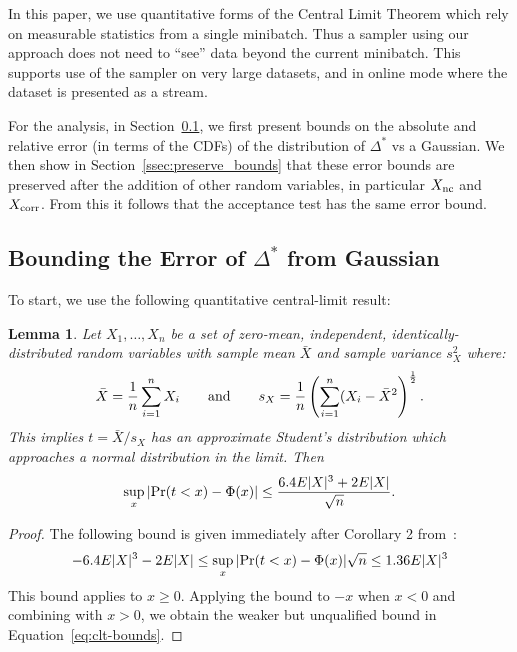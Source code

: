 \documentclass{article}
\newtheorem{lemma}{Lemma}
\begin{document}
In this paper, we use quantitative forms of the Central Limit Theorem which rely
on measurable statistics from a single minibatch. Thus a sampler using our
approach does not need to ``see'' data beyond the current minibatch. This
supports use of the sampler on very large datasets, and in online mode where the
dataset is presented as a stream.

For the analysis, in Section~\ref{ssec:delta_star_distribution}, we first
present bounds on the absolute and relative error (in terms of the CDFs) of the
distribution of $\Delta^*$ vs a Gaussian. We then show in
Section~\ref{ssec:preserve_bounds} that these error bounds are preserved after
the addition of other random variables, in particular $X_{\rm nc}$ and $X_{\rm
corr}$. From this it follows that the acceptance test has the same error bound.

\subsection{Bounding the Error of $\Delta^*$ from Gaussian}\label{ssec:delta_star_distribution}

To start, we use the following quantitative central-limit result:
  
\begin{lemma}\label{lem:quant_clt}
Let $X_1,\ldots,X_n$ be a set of zero-mean, independent, identically-distributed
random variables with sample mean $\bar{X}$ and sample variance $s^2_X$
where:
\begin{equation}
    \bar{X} = \frac{1}{n}\sum_{i=1}^nX_i \qquad {\rm and} \qquad s_X = \frac{1}{n}\left(\sum_{i=1}^n(X_i-\bar{X}^2\right)^{\frac{1}{2}}.
\end{equation}
This implies $t=\bar{X}/s_X$ has an approximate Student's distribution
which approaches a normal distribution in the limit. Then
\begin{equation}\label{eq:clt-bounds}
    \sup_x|{\rm Pr}(t<x) - \Phi(x)| \leq \frac{6.4E|X|^3+2E|X|}{\sqrt{n}}.
\end{equation}
\end{lemma}

\begin{proof}
The following bound is given immediately after Corollary 2 from~\cite{explicit-clt05}:
\begin{equation}\label{eq:clt-boundsx}
-6.4E|X|^3-2E|X| \leq    \sup_x|{\rm Pr}(t<x) - \Phi(x)|{\sqrt{n}} \leq 1.36E|X|^3
\end{equation}
This bound applies to $x\geq 0$. Applying the bound to $-x$ when $x<0$
and combining with $x>0$, we obtain the weaker but unqualified bound
in Equation~\ref{eq:clt-bounds}.
\end{proof}
\end{document}
